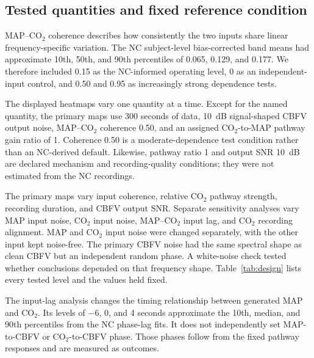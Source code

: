 \documentclass[12pt]{article}
\begin{document}
\subsection{Tested quantities and fixed reference condition}

MAP--CO$_2$ coherence describes how consistently the two inputs share linear
frequency-specific variation. The NC subject-level bias-corrected band means
had approximate 10th, 50th, and 90th percentiles of 0.065, 0.129, and 0.177.
We therefore included 0.15 as the NC-informed operating level, 0 as an
independent-input control, and 0.50 and 0.95 as increasingly strong dependence
tests.

The displayed heatmaps vary one quantity at a time. Except for the named
quantity, the primary maps use 300 seconds of data, 10~dB signal-shaped CBFV
output noise, MAP--CO$_2$ coherence 0.50, and an assigned CO$_2$-to-MAP pathway
gain ratio of 1. Coherence 0.50 is a moderate-dependence test condition rather
than an NC-derived default. Likewise, pathway ratio 1 and output SNR 10~dB are
declared mechanism and recording-quality conditions; they were not estimated
from the NC recordings.

The primary maps vary input coherence, relative CO$_2$ pathway strength,
recording duration, and CBFV output SNR. Separate sensitivity analyses vary
MAP input noise, CO$_2$ input noise, MAP--CO$_2$ input lag, and CO$_2$
recording alignment. MAP and CO$_2$ input noise were changed separately, with
the other input kept noise-free. The primary CBFV noise had the same spectral
shape as clean CBFV but an independent random phase. A white-noise check tested
whether conclusions depended on that frequency shape. Table~\ref{tab:design}
lists every tested level and the values held fixed.

\begin{table}[H]
    \centering
    \caption{Simulation quantities, tested levels, fixed settings, and the
    basis for selecting each level.}
    \label{tab:design}
    \scriptsize
    
\end{table}

The input-lag analysis changes the timing relationship between generated MAP
and CO$_2$. Its levels of $-6$, 0, and 4 seconds approximate the 10th, median,
and 90th percentiles from the NC phase-lag fits. It does not independently set
MAP-to-CBFV or CO$_2$-to-CBFV phase. Those phases follow from the fixed pathway
responses and are measured as outcomes.
\end{document}
